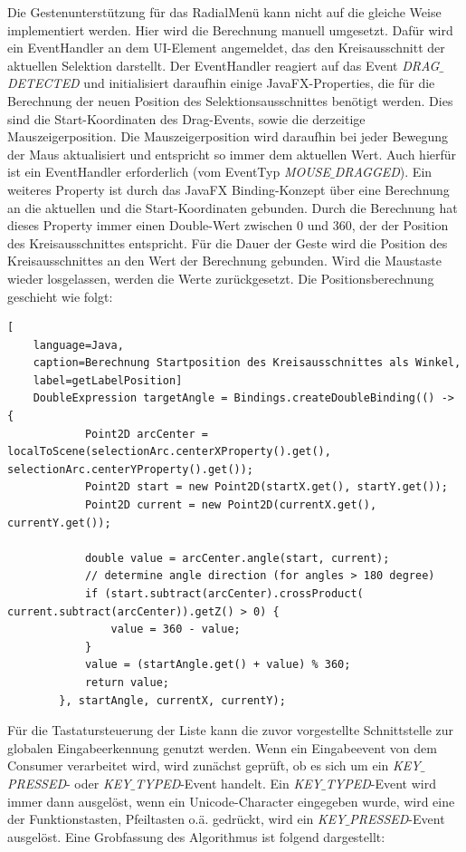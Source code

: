 Die Gestenunterstützung für das RadialMenü kann nicht auf die gleiche Weise implementiert werden. Hier wird die Berechnung manuell umgesetzt. Dafür wird ein EventHandler an dem UI-Element angemeldet, das den Kreisausschnitt der aktuellen Selektion darstellt. Der EventHandler reagiert auf das Event \textit{DRAG$\_$DETECTED} und initialisiert daraufhin einige JavaFX-Properties, die für die Berechnung der neuen Position des Selektionsausschnittes benötigt werden. Dies sind die Start-Koordinaten des Drag-Events, sowie die derzeitige Mauszeigerposition. Die Mauszeigerposition wird daraufhin bei jeder Bewegung der Maus aktualisiert und entspricht so immer dem aktuellen Wert. Auch hierfür ist ein EventHandler erforderlich (vom EventTyp \textit{MOUSE$\_$DRAGGED}). Ein weiteres Property ist durch das JavaFX Binding-Konzept über eine Berechnung an die aktuellen und die Start-Koordinaten gebunden. Durch die Berechnung hat dieses Property immer einen Double-Wert zwischen 0 und 360, der der Position des Kreisausschnittes entspricht. Für die Dauer der Geste wird die Position des Kreisausschnittes an den Wert der Berechnung gebunden. Wird die Maustaste wieder losgelassen, werden die Werte zurückgesetzt. Die Positionsberechnung geschieht wie folgt:\par
\begin{lstlisting}[
    language=Java,
    caption=Berechnung Startposition des Kreisausschnittes als Winkel,
    label=getLabelPosition]
    DoubleExpression targetAngle = Bindings.createDoubleBinding(() -> {
            Point2D arcCenter = localToScene(selectionArc.centerXProperty().get(), selectionArc.centerYProperty().get());
            Point2D start = new Point2D(startX.get(), startY.get());
            Point2D current = new Point2D(currentX.get(), currentY.get());

            double value = arcCenter.angle(start, current);
            // determine angle direction (for angles > 180 degree)
            if (start.subtract(arcCenter).crossProduct( current.subtract(arcCenter)).getZ() > 0) {
                value = 360 - value;
            }
            value = (startAngle.get() + value) % 360;
            return value;
        }, startAngle, currentX, currentY);
\end{lstlisting}
Für die Tastatursteuerung der Liste kann die zuvor vorgestellte Schnittstelle zur globalen Eingabeerkennung genutzt werden. Wenn ein Eingabeevent von dem Consumer verarbeitet wird, wird zunächst geprüft, ob es sich um ein \textit{KEY$\_$PRESSED}- oder \textit{KEY$\_$TYPED}-Event handelt. Ein \textit{KEY$\_$TYPED}-Event wird immer dann ausgelöst, wenn ein Unicode-Character eingegeben wurde, wird eine der Funktionstasten, Pfeiltasten o.ä. gedrückt, wird ein \textit{KEY$\_$PRESSED}-Event ausgelöst. Eine Grobfassung des Algorithmus ist folgend dargestellt:\par
